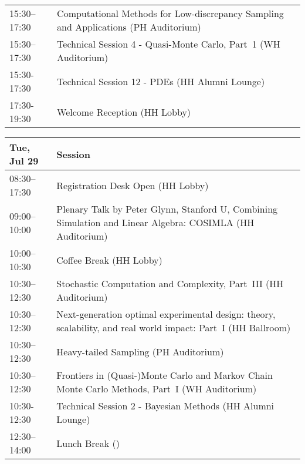 \begin{table}
{\begin{tabularx}{\textwidth}{>{\hsize=0.32\hsize}X|>{\hsize=1.7\hsize}X}
\cellcolor{\SessionTitleColor}15:30–17:30 & \cellcolor{\SessionTitleColor}Computational Methods for Low-discrepancy Sampling and Applications (PH Auditorium) \\
\cellcolor{\SessionLightColor}15:30–17:30 & \cellcolor{\SessionLightColor}Technical Session 4 - Quasi-Monte Carlo, Part~1 (WH Auditorium) \\
\cellcolor{\SessionLightColor}15:30-17:30 & \cellcolor{\SessionLightColor}Technical Session 12 - PDEs (HH Alumni Lounge) \\
\cellcolor{\EmptyColor}17:30-19:30 & \cellcolor{\EmptyColor}Welcome Reception (HH Lobby) \\
\hline
\end{tabularx}
}
\end{table}

\begin{table}
{\footnotesize
\begin{tabularx}{\textwidth}{>{\hsize=0.32\hsize}X|>{\hsize=1.7\hsize}X}
\hline
\textbf{Tue, Jul 29} & \textbf{Session} \\
\hline
\cellcolor{\EmptyColor}08:30–17:30 & \cellcolor{\EmptyColor}Registration Desk Open (HH Lobby) \\
\cellcolor{\PlenaryColor}09:00–10:00 & \cellcolor{\PlenaryColor}Plenary Talk by Peter Glynn, Stanford U, Combining Simulation and Linear Algebra: COSIMLA (HH Auditorium) \\
\cellcolor{\EmptyColor}10:00–10:30 & \cellcolor{\EmptyColor}Coffee Break (HH Lobby) \\
\cellcolor{\SessionTitleColor}10:30–12:30 & \cellcolor{\SessionTitleColor}Stochastic Computation and Complexity, Part~III (HH Auditorium) \\
\cellcolor{\SessionTitleColor}10:30–12:30 & \cellcolor{\SessionTitleColor}Next-generation optimal experimental design: theory, scalability, and real world impact: Part~I (HH Ballroom) \\
\cellcolor{\SessionTitleColor}10:30–12:30 & \cellcolor{\SessionTitleColor}Heavy-tailed Sampling (PH Auditorium) \\
\cellcolor{\SessionTitleColor}10:30–12:30 & \cellcolor{\SessionTitleColor}Frontiers in (Quasi-)Monte Carlo and Markov Chain Monte Carlo Methods, Part~I (WH Auditorium) \\
\cellcolor{\SessionLightColor}10:30-12:30 & \cellcolor{\SessionLightColor}Technical Session 2 - Bayesian Methods (HH Alumni Lounge) \\
\cellcolor{\EmptyColor}12:30–14:00 & \cellcolor{\EmptyColor}Lunch Break () \\

\end{tabularx}}
\end{table}
